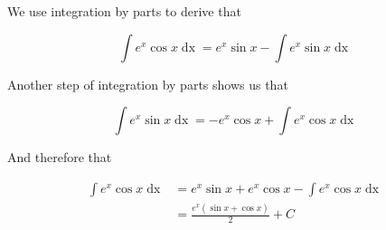 \documentclass[a4paper, titlepage]{article}
\begin{document}
\begin{Answer}

We use integration by parts to derive that

\[\int e^x \cos x \mathop{dx}
  = e^x \sin x - \int e^x \sin x \mathop{dx}\]

Another step of integration by parts shows us that

    \[\int e^x \sin x \mathop{dx} = - e^x \cos x + \int e^x \cos x \mathop{dx}\]

And therefore that

\begin{align*}
\int e^x \cos x \mathop{dx} &= e^x \sin x + e^x \cos x - \int e^x \cos x \mathop{dx} \\
 &= \frac{e^x \left(\sin x + \cos x \right)}{2} + C
\end{align*}
\end{Answer}

\printbibliography
\end{document}

